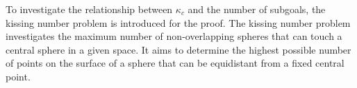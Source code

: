 %
%
%


To investigate the relationship between $\kappa_c$ and the number of subgoals,
the kissing number problem is introduced for the proof.
The kissing number problem investigates the maximum number of non-overlapping spheres that can touch a central sphere in a given space.
It aims to determine the highest possible number of points on the surface of a sphere that can be equidistant from a fixed central point.



